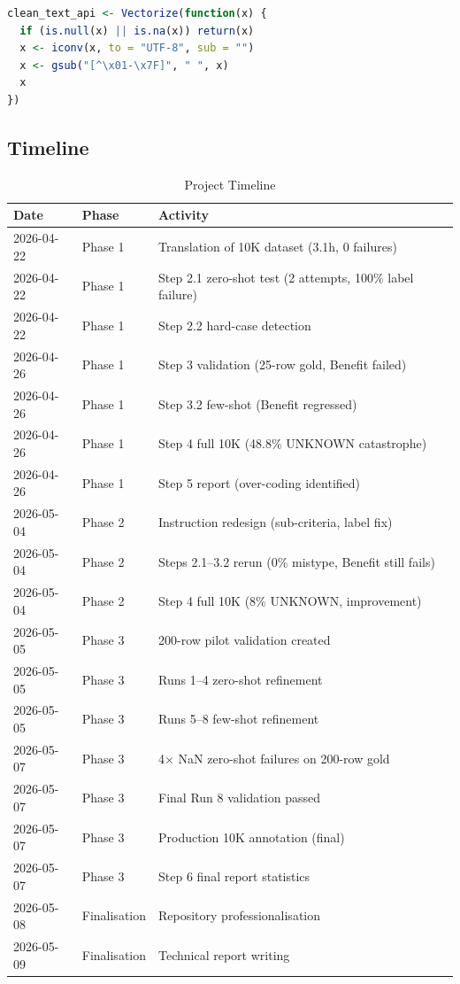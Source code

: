 \begin{lstlisting}[language=R,caption={\texttt{clean\_text\_api()} --- Non-ASCII Cleaner}]
clean_text_api <- Vectorize(function(x) {
  if (is.null(x) || is.na(x)) return(x)
  x <- iconv(x, to = "UTF-8", sub = "")
  x <- gsub("[^\x01-\x7F]", " ", x)
  x
})
\end{lstlisting}

\subsection{Timeline}
\label{app:timeline}

\begin{longtable}{@{}llp{8cm}@{}}
\caption{Project Timeline} \\
\toprule
\textbf{Date} & \textbf{Phase} & \textbf{Activity} \\
\midrule
\endfirsthead
2026-04-22 & Phase 1 & Translation of 10K dataset (3.1h, 0 failures) \\
2026-04-22 & Phase 1 & Step 2.1 zero-shot test (2 attempts, 100\% label failure) \\
2026-04-22 & Phase 1 & Step 2.2 hard-case detection \\
2026-04-26 & Phase 1 & Step 3 validation (25-row gold, Benefit failed) \\
2026-04-26 & Phase 1 & Step 3.2 few-shot (Benefit regressed) \\
2026-04-26 & Phase 1 & Step 4 full 10K (48.8\% UNKNOWN catastrophe) \\
2026-04-26 & Phase 1 & Step 5 report (over-coding identified) \\
\midrule
2026-05-04 & Phase 2 & Instruction redesign (sub-criteria, label fix) \\
2026-05-04 & Phase 2 & Steps 2.1--3.2 rerun (0\% mistype, Benefit still fails) \\
2026-05-04 & Phase 2 & Step 4 full 10K (8\% UNKNOWN, improvement) \\
\midrule
2026-05-05 & Phase 3 & 200-row pilot validation created \\
2026-05-05 & Phase 3 & Runs 1--4 zero-shot refinement \\
2026-05-05 & Phase 3 & Runs 5--8 few-shot refinement \\
2026-05-07 & Phase 3 & 4$\times$ NaN zero-shot failures on 200-row gold \\
2026-05-07 & Phase 3 & Final Run 8 validation passed \\
2026-05-07 & Phase 3 & Production 10K annotation (final) \\
2026-05-07 & Phase 3 & Step 6 final report statistics \\
\midrule
2026-05-08 & Finalisation & Repository professionalisation \\
2026-05-09 & Finalisation & Technical report writing \\
\bottomrule
\end{longtable}


